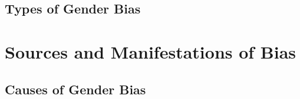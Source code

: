 \subsection{Types of Gender Bias}



\section{Sources and Manifestations of Bias}
\subsection{Causes of Gender Bias}



